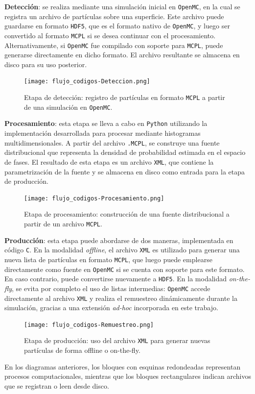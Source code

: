 \textbf{Detección}: se realiza mediante una simulación inicial en \texttt{OpenMC}, en la cual se registra un archivo de partículas sobre una superficie. Este archivo puede guardarse en formato \texttt{HDF5}, que es el formato nativo de \texttt{OpenMC}, y luego ser convertido al formato \texttt{MCPL} si se desea continuar con el procesamiento. Alternativamente, si \texttt{OpenMC} fue compilado con soporte para \texttt{MCPL}, puede generarse directamente en dicho formato. El archivo resultante se almacena en disco para su uso posterior.

\begin{figure}[H]
    \centering
    \texttt{[image: flujo\_codigos-Deteccion.png]}
    \caption{Etapa de detección: registro de partículas en formato \texttt{MCPL} a partir de una simulación en \texttt{OpenMC}.}
\end{figure}

\textbf{Procesamiento}: esta etapa se lleva a cabo en \texttt{Python} utilizando la implementación desarrollada para procesar mediante histogramas multidimensionales. A partir del archivo \texttt{.MCPL}, se construye una fuente distribucional que representa la densidad de probabilidad estimada en el espacio de fases. El resultado de esta etapa es un archivo \texttt{XML}, que contiene la parametrización de la fuente y se almacena en disco como entrada para la etapa de producción.

\begin{figure}[H]
    \centering
    \texttt{[image: flujo\_codigos-Procesamiento.png]}
    \caption{Etapa de procesamiento: construcción de una fuente distribucional a partir de un archivo \texttt{MCPL}.}
\end{figure}

\textbf{Producción}: esta etapa puede abordarse de dos maneras, implementada en código \texttt{C}. En la modalidad \textit{offline}, el archivo \texttt{XML} es utilizado para generar una nueva lista de partículas en formato \texttt{MCPL}, que luego puede emplearse directamente como fuente en \texttt{OpenMC} si se cuenta con soporte para este formato. En caso contrario, puede convertirse nuevamente a \texttt{HDF5}. En la modalidad \textit{on-the-fly}, se evita por completo el uso de listas intermedias: \texttt{OpenMC} accede directamente al archivo \texttt{XML} y realiza el remuestreo dinámicamente durante la simulación, gracias a una extensión \emph{ad-hoc} incorporada en este trabajo.

\begin{figure}[H]
    \centering
    \texttt{[image: flujo\_codigos-Remuestreo.png]}
    \caption{Etapa de producción: uso del archivo \texttt{XML} para generar nuevas partículas de forma offline o on-the-fly.}
\end{figure}

En los diagramas anteriores, los bloques con esquinas redondeadas representan procesos computacionales, mientras que los bloques rectangulares indican archivos que se registran o leen desde disco.


